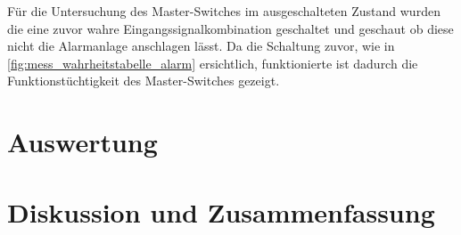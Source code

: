 \documentclass[12pt,english,ngerman]{scrartcl}
\begin{document}
Für die Untersuchung des Master-Switches im ausgeschalteten Zustand wurden die
eine zuvor wahre Eingangssignalkombination geschaltet und geschaut ob diese
nicht die Alarmanlage anschlagen lässt. Da die Schaltung zuvor, wie in
\autoref{fig:mess_wahrheitstabelle_alarm} ersichtlich, funktionierte ist
dadurch die Funktionstüchtigkeit des Master-Switches gezeigt.


\section{Auswertung}\label{sec:Auswertung}


\section{Diskussion und Zusammenfassung}\label{sec:Diskussion} 
\end{document}
